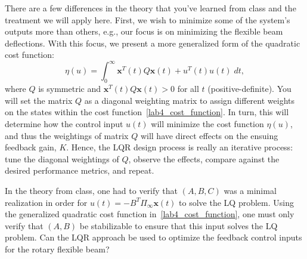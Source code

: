 \documentclass[12pt]{report}
\newcommand\drew[1]{\textcolor{red}{#1}}
\begin{document}
There are a few differences in the theory that you've learned from class and the treatment we will apply here. First, we wish to minimize some of the system's outputs more than others, e.g., our focus is on minimizing the flexible beam deflections. With this focus, we present a more generalized form of the quadratic cost function:
\begin{equation}\label{lab4_cost_function}
    \eta(u) = \int_0^{\infty} \mathbf{x}^T(t) Q \mathbf{x}(t) + u^T(t)u(t) \; dt,
\end{equation}
where $Q$ is symmetric and $\mathbf{x}^T(t) Q \mathbf{x}(t) > 0$ for all $t$ (positive-definite). You will set the matrix $Q$ as a diagonal weighting matrix to assign different weights on the states within the cost function~\eqref{lab4_cost_function}. In turn, this will determine how the control input $u(t)$ will minimize the cost function $\eta(u)$, and thus the weightings of matrix $Q$ will have direct effects on the ensuing feedback gain, $K$. Hence, the LQR design process is really an iterative process: tune the diagonal weightings of $Q$, observe the effects, compare against the desired performance metrics, and repeat.

In the theory from class, one had to verify that $(A,B,C)$ was a minimal realization in order for $u(t)=-B^T \Pi_{\infty} \mathbf{x}(t)$ to solve the LQ problem. Using the generalized quadratic cost function in~\eqref{lab4_cost_function}, one must only verify that $(A,B)$ be stabilizable to ensure that this input solves the LQ problem. Can the LQR approach be used to optimize the feedback control inputs for the rotary flexible beam?\\
\end{document}

